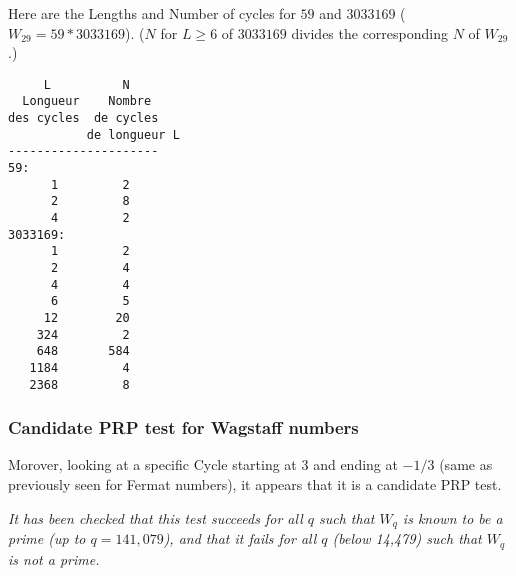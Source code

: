 \documentclass[latin1]{quadrature}
\newif\ifenfrancais
\begin{document}
\begin{article}
\begin{article}
\vspace{.1in}
\ifenfrancais
Voici les Longueur et Nombres de Cycles pour $59$ et $3033169$ ($W_{29}=59 * 3033169$). ($N$ pour $L \geq 6$ de $3033169$ divise les $N$ correspondants de $W_{29}$.)
\else
Here are the Lengths and Number of cycles for $59$ and $3033169$ ($W_{29}=59 * 3033169$). ($N$ for $L \geq 6$ of $3033169$ divides the corresponding $N$ of $W_{29}$.)
\fi

\vspace{-.1in}
\small
\begin{verbatim}
     L          N           
  Longueur    Nombre      
des cycles  de cycles      
           de longueur L    
---------------------
59:
      1         2
      2         8
      4         2
3033169:
      1         2
      2         4
      4         4
      6         5
     12        20
    324         2
    648       584
   1184         4
   2368         8
\end{verbatim}
\normalsize


\ifenfrancais
\subsubsection { Test PRP candidat pour les Wagstaff }
\else
\subsubsection { Candidate PRP test for Wagstaff numbers }
\fi

\ifenfrancais
De plus, en regardant un Cycle sp\'ecifique commen\c{c}ant \`a $3$ et finissant \`a $-1/3$ (identique \`a ce qui a \'et\'e vu pour les nombres de Fermat), il appara\^it que c'est un test PRP candidat.
\else
Morover, looking at a specific Cycle starting at $3$ and ending at $-1/3$ (same as previously seen for Fermat numbers), it appears that it is a candidate PRP test.
\fi

\ifenfrancais
\emph{J'ai v\'erifi\'e que ce test r\'eussit pour tout les $q$ tels que $W_q$ est connu pour \^etre premier (jusqu'\`a $q=141.079$), et qu'il \'echoue pour tous les $q$ (inf\'erieurs \`a $14.479$) tel que $W_q$ n'est pas premier.}
\else
\emph{It has been checked that this test succeeds for all $q$ such that $W_q$ is known to be a prime (up to $q=141,079$), and that it fails for all $q$ (below 14,479) such that $W_q$ is not a prime.}
\fi

\vspace{.05in}


\end{article}
\end{article}
\end{document}
